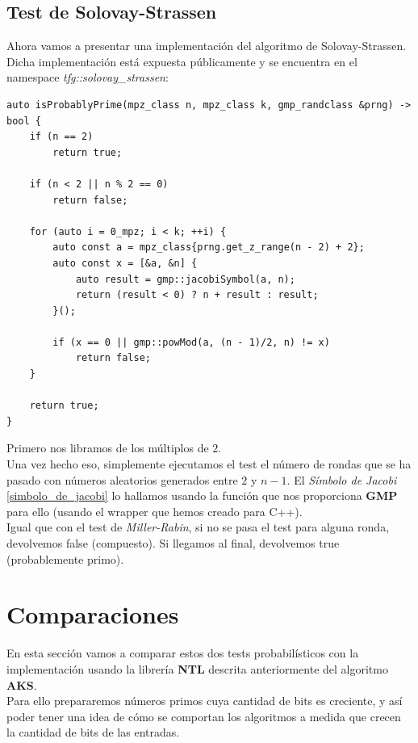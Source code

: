 \subsection{Test de Solovay-Strassen}

Ahora vamos a presentar una implementación del algoritmo de Solovay-Strassen. Dicha implementación está expuesta públicamente y se encuentra en el namespace \textit{tfg::solovay\_strassen}:\\

\begin{lstlisting}
auto isProbablyPrime(mpz_class n, mpz_class k, gmp_randclass &prng) -> bool {
	if (n == 2)
		return true;
	
	if (n < 2 || n % 2 == 0)
		return false;
	
	for (auto i = 0_mpz; i < k; ++i) {
		auto const a = mpz_class{prng.get_z_range(n - 2) + 2};
		auto const x = [&a, &n] {
			auto result = gmp::jacobiSymbol(a, n);
			return (result < 0) ? n + result : result;
		}();
		
		if (x == 0 || gmp::powMod(a, (n - 1)/2, n) != x)
			return false;
	}
	
	return true;
}
\end{lstlisting}

Primero nos libramos de los múltiplos de $2$.\\

Una vez hecho eso, simplemente ejecutamos el test el número de rondas que se ha pasado con números aleatorios generados entre $2$ y $n-1$. El \textit{Símbolo de Jacobi} \ref{simbolo_de_jacobi} lo hallamos usando la función que nos proporciona \textbf{GMP} para ello (usando el wrapper que hemos creado para C++).\\

Igual que con el test de \textit{Miller-Rabin}, si no se pasa el test para alguna ronda, devolvemos false (compuesto). Si llegamos al final, devolvemos true (probablemente primo).

\section{Comparaciones}

En esta sección vamos a comparar estos dos tests probabilísticos con la implementación usando la librería \textbf{NTL} descrita anteriormente del algoritmo \textbf{AKS}.\\

Para ello prepararemos números primos cuya cantidad de bits es creciente, y así poder tener una idea de cómo se comportan los algoritmos a medida que crecen la cantidad de bits de las entradas.\\

